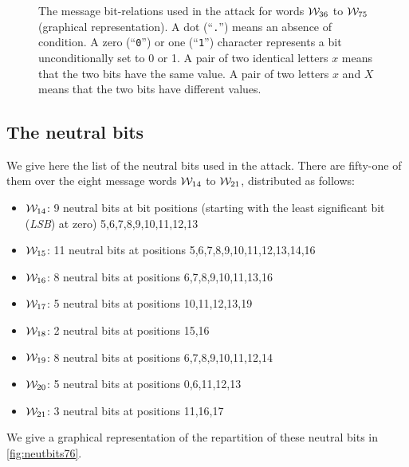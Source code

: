 \begin{figure}[ht]
\centering
  \theverbbox
  \caption[The message bit-relations used in the attack for words $\expmess_{36}$ to $\expmess_{75}$ (graphical representation).]{The message bit-relations used in the attack for words $\expmess_{36}$ to $\expmess_{75}$ (graphical representation).
  A dot (``\texttt{.}'') means an absence of condition. A zero (``\texttt{0}'') or one (``\texttt{1}'') character represents a bit unconditionally set to 0 or 1.
  A pair of two identical letters $x$ means that the two bits have the same value. A pair of two
  letters $x$ and $X$ means that the two bits have different values.
  \label{fig:msgbitrel76_graph}}
\end{figure}

\subsection{The neutral bits}
\label{sec:neutral_bits76}
We give here the list of the neutral bits used in the attack.
There are fifty-one of them over the eight message words
$\mathcal{W}_{14}$ to $\mathcal{W}_{21}$, distributed as
follows:
\begin{itemize}
\item $\mathcal{W}_{14}$: 9 neutral bits at  bit positions (starting with the least significant bit (\emph{LSB}) at zero) 5,6,7,8,9,10,11,12,13
\item $\mathcal{W}_{15}$: 11 neutral bits at positions 5,6,7,8,9,10,11,12,13,14,16
\item $\mathcal{W}_{16}$: 8 neutral bits at positions 6,7,8,9,10,11,13,16
\item $\mathcal{W}_{17}$: 5 neutral bits at positions 10,11,12,13,19
\item $\mathcal{W}_{18}$: 2 neutral bits at positions 15,16
\item $\mathcal{W}_{19}$: 8 neutral bits at positions 6,7,8,9,10,11,12,14
\item $\mathcal{W}_{20}$: 5 neutral bits at positions 0,6,11,12,13
\item $\mathcal{W}_{21}$: 3 neutral bits at positions 11,16,17
\end{itemize}
We give a graphical representation of the repartition of these neutral bits in \autoref{fig:neutbits76}.

